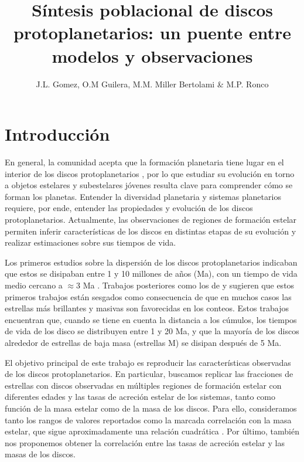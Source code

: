 \documentclass[baaa]{baaa}
\title{ Síntesis poblacional de discos protoplanetarios: un puente entre modelos y observaciones}
\author{
J.L. Gomez\inst{1,2}, O.M Guilera\inst{1,2}, M.M. Miller Bertolami\inst{1,2} \& M.P. Ronco\inst{1,2}
}
\institute{
Instituto de Astrof{\'\i}sica de La Plata, CONICET--UNLP, Argentina
\and
Facultad de Ciencias Astron\'omicas y Geof{\'\i}sicas, UNLP, Argentina
}
\begin{document}
\maketitle
\section{Introducci\'on}\label{S_intro}
En general, la comunidad acepta que la formación planetaria tiene lugar en el interior de los discos protoplanetarios \citep[e.g.][]{Venturini20Review}, por lo que estudiar su evolución en torno a objetos estelares y subestelares jóvenes resulta clave para comprender cómo se forman los planetas. Entender la diversidad planetaria y sistemas planetarios requiere, por ende, entender las propiedades y evolución de los discos protoplanetarios. Actualmente, las observaciones de regiones de formación estelar permiten inferir características de los discos en distintas etapas de su evolución y realizar estimaciones sobre sus tiempos de vida.

Los primeros estudios sobre la dispersión de los discos protoplanetarios indicaban que estos se disipaban entre 1 y 10 millones de años (Ma), con un tiempo de vida medio cercano a $ \approx 3$  Ma \citep{haisch2001disc, MamajekE}. Trabajos posteriores como los de \cite{Pfalzner_2022} y \citet{2024ApJPfalzner} sugieren que estos primeros trabajos están sesgados como consecuencia de que en muchos casos las estrellas m\'as brillantes y masivas son favorecidas en los conteos. Estos trabajos encuentran que, cuando se tiene en cuenta la distancia a los cúmulos, los tiempos de vida de los disco se distribuyen entre 1 y 20 Ma, y que la mayoría de los discos alrededor de estrellas de baja masa (estrellas M) se disipan después de 5 Ma.

El objetivo principal de este trabajo es reproducir las características observadas de los discos protoplanetarios. En particular, buscamos replicar las fracciones de estrellas con discos observadas en múltiples regiones de formación estelar con diferentes edades \citep{MamajekE, Pfalzner_2022} y las tasas de acreción estelar de los sistemas, tanto como función de la masa estelar como de la masa de los discos. Para ello, consideramos tanto los rangos de valores reportados como la marcada correlación con la masa estelar, que sigue aproximadamente una relación cuadrática \citep{Muzerolle_2000, manara2023ASPC}. Por último, también nos proponemos obtener la correlación entre las tasas de acreción estelar y las masas de los discos. 
\end{document}
